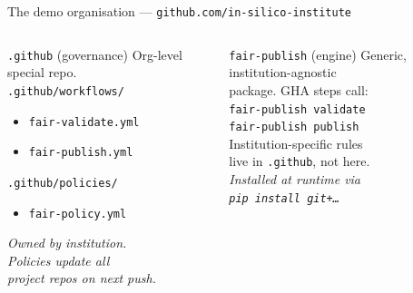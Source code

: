 \documentclass[aspectratio=169]{beamer}
\begin{document}
\begin{frame}[shrink=5]{The demo organisation --- \texttt{github.com/in-silico-institute}}
  \begin{columns}[T]
      \begin{block}{\texttt{.github} (governance)}
        \footnotesize
        Org-level special repo.\\[4pt]
        \texttt{.github/workflows/}
        \begin{itemize}\setlength\itemsep{1pt}
          \item \texttt{fair-validate.yml}
          \item \texttt{fair-publish.yml}
        \end{itemize}
        \texttt{.github/policies/}
        \begin{itemize}\setlength\itemsep{1pt}
          \item \texttt{fair-policy.yml}
        \end{itemize}
        \vspace{4pt}
        \textit{Owned by institution.\\Policies update all\\project repos on next push.}
      \end{block}

      \begin{block}{\texttt{fair-publish} (engine)}
        \footnotesize
        Generic, institution-agnostic\\package. GHA steps call:\\[4pt]
        \texttt{fair-publish validate}\\
        \texttt{fair-publish publish}\\[4pt]
        Institution-specific rules\\live in \texttt{.github}, not here.\\[4pt]
        \textit{Installed at runtime via\\
        \texttt{pip install git+\ldots}}
      \end{block}


\end{columns}
\end{frame}
\end{document}
